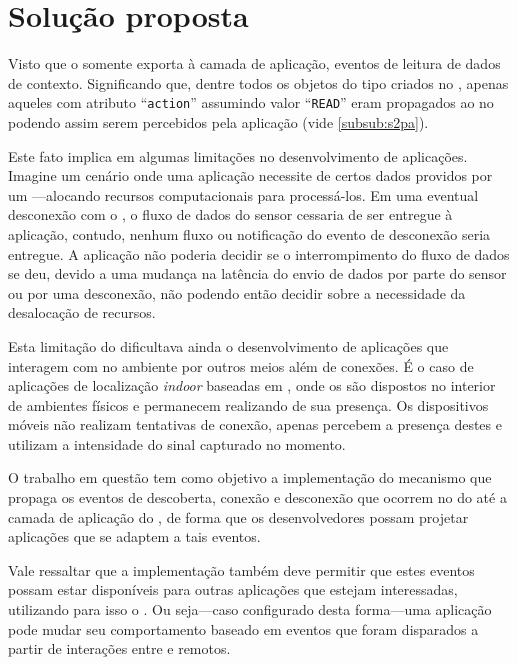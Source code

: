 \chapter{Solução proposta}\label{chap:solucao}

Visto que o \cddl somente exporta à camada de aplicação, eventos de leitura de dados de contexto.
Significando que, dentre todos os objetos do tipo \sensordata criados no \stwopa, apenas aqueles com atributo ``\texttt{action}'' assumindo valor ``\texttt{READ}'' eram propagados ao \qocevaluator no \cddl podendo assim serem percebidos pela aplicação (vide \autoref{subsub:s2pa}).

Este fato implica em algumas limitações no desenvolvimento de aplicações.
Imagine um cenário onde uma aplicação necessite de certos dados providos por um \smartobj---alocando recursos computacionais para processá-los.
Em uma eventual desconexão com o \smartobj, o fluxo de dados do sensor cessaria de ser entregue à aplicação, contudo, nenhum fluxo ou notificação do evento de desconexão seria entregue.
A aplicação não poderia decidir se o interrompimento do fluxo de dados se deu, devido a uma mudança na latência do envio de dados por parte do sensor ou por uma desconexão, não podendo então decidir sobre a necessidade da desalocação de recursos.

Esta limitação do \cddl dificultava ainda o desenvolvimento de aplicações que interagem com \smartobjs no ambiente por outros meios além de conexões.
É o caso de aplicações de localização \textit{indoor} baseadas em \beacons \bluetooth, onde os \beacons são dispostos no interior de ambientes físicos e permanecem realizando \broadcast de sua presença.
Os dispositivos móveis não realizam tentativas de conexão, apenas percebem a presença destes \smartobjs e utilizam a intensidade do sinal capturado no momento.

O trabalho em questão tem como objetivo a implementação do mecanismo que propaga os eventos de descoberta, conexão e desconexão que ocorrem no \stwopa do \mhub até a camada de aplicação do \cddl, de forma que os desenvolvedores possam projetar aplicações que se adaptem a tais eventos.

Vale ressaltar que a implementação também deve permitir que estes eventos possam estar disponíveis para outras aplicações que estejam interessadas, utilizando para isso o \mqtt.
Ou seja---caso configurado desta forma---uma aplicação \mhubcddl pode mudar seu comportamento baseado em eventos que foram disparados a partir de interações entre \smartobjs e \smartphones remotos.

